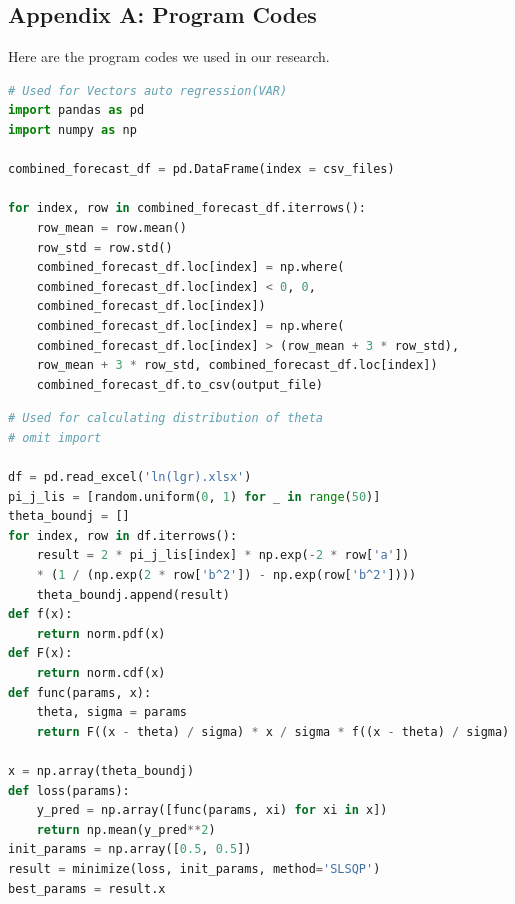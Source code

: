 \documentclass[12pt]{article}  %
\begin{document}
\begin{subappendices}  %

\section{Appendix A: Program Codes}
Here are the program codes we used in our research.


\begin{lstlisting}[language=Python, name={var.py}]
# Used for Vectors auto regression(VAR)
import pandas as pd
import numpy as np

combined_forecast_df = pd.DataFrame(index = csv_files)

for index, row in combined_forecast_df.iterrows():
    row_mean = row.mean()
    row_std = row.std()
    combined_forecast_df.loc[index] = np.where(
    combined_forecast_df.loc[index] < 0, 0, 
    combined_forecast_df.loc[index])
    combined_forecast_df.loc[index] = np.where(
    combined_forecast_df.loc[index] > (row_mean + 3 * row_std),
    row_mean + 3 * row_std, combined_forecast_df.loc[index])
    combined_forecast_df.to_csv(output_file)
\end{lstlisting}

\begin{lstlisting}[language=Python, name={cal_theta.py}]
# Used for calculating distribution of theta
# omit import

df = pd.read_excel('ln(lgr).xlsx')
pi_j_lis = [random.uniform(0, 1) for _ in range(50)]
theta_boundj = []
for index, row in df.iterrows():
    result = 2 * pi_j_lis[index] * np.exp(-2 * row['a']) 
    * (1 / (np.exp(2 * row['b^2']) - np.exp(row['b^2'])))
    theta_boundj.append(result)
def f(x):
    return norm.pdf(x)
def F(x):
    return norm.cdf(x)
def func(params, x):
    theta, sigma = params
    return F((x - theta) / sigma) * x / sigma * f((x - theta) / sigma)

x = np.array(theta_boundj)
def loss(params):
    y_pred = np.array([func(params, xi) for xi in x])
    return np.mean(y_pred**2)
init_params = np.array([0.5, 0.5])
result = minimize(loss, init_params, method='SLSQP')
best_params = result.x
\end{lstlisting}

\clearpage

\end{subappendices}  %
\end{document}
